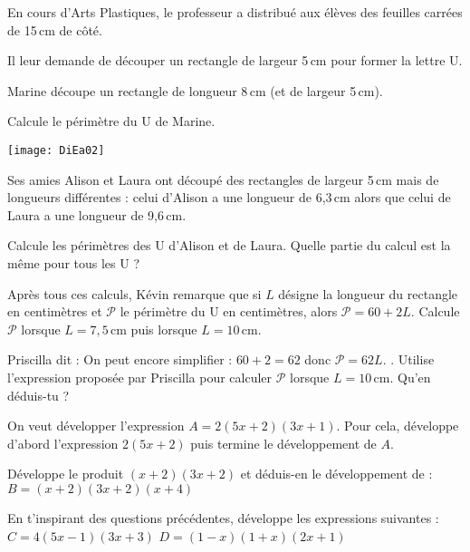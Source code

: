 \begin{exercice}
En cours d'Arts Plastiques, le professeur a distribué aux élèves des feuilles carrées de 15\,cm de côté.

Il leur demande de découper un rectangle de largeur 5\,cm pour former la lettre U. 

\begin{colenumerate}{1} 
\item Marine découpe un rectangle de longueur 8\,cm (et de largeur 5\,cm).

Calcule le périmètre du U de Marine.

    \begin{center}
    \texttt{[image: DiEa02]}
    \end{center}
 
\item Ses amies Alison et Laura ont découpé des rectangles de largeur 5\,cm mais de longueurs différentes : celui d'Alison a une longueur de 6,3\,cm alors que celui de Laura a une longueur de 9,6\,cm. 
 
Calcule les périmètres des U d'Alison et de Laura. Quelle partie du calcul est la même pour tous les U ?

\item Après tous ces calculs, Kévin remarque que si $L$ désigne la longueur du rectangle en centimètres et $\mathcal{P}$ le périmètre du U en centimètres, alors  $\mathcal{P}= 60 + 2L$. Calcule $\mathcal{P}$ lorsque $L = 7,5$\,cm puis lorsque $L = 10$\,cm.
\item Priscilla dit : \og On peut encore simplifier : $60 + 2 = 62$ donc $\mathcal{P} = 62 L$. \fg. Utilise l'expression proposée par Priscilla pour calculer $\mathcal{P}$ lorsque $L = 10$\,cm. Qu'en déduis-tu ?
\end{colenumerate} 
\end{exercice}

\begin{exercice}

\begin{colenumerate}{1} 
\item On veut développer l'expression $A = 2(5x + 2)(3x + 1)$. Pour cela, développe d'abord l'expression $2(5x + 2)$ puis termine le développement de $A$.
\item Développe le produit $(x + 2)(3x + 2)$ et déduis-en le développement de :
    \subitem $B = (x + 2)(3x + 2)(x + 4)$
\item En t'inspirant des questions précédentes, développe les expressions suivantes :
    \subitem $C = 4(5x -1)(3x + 3) $
    \subitem $D = (1 -x)(1 + x)(2x + 1)$
\end{colenumerate}
\end{exercice}




